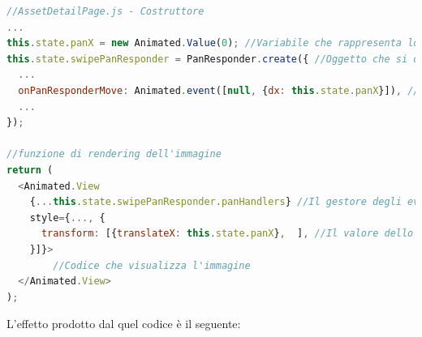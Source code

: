 \begin{lstlisting}[language=JavaScript, caption=AssetDetailPage - Spostamento dell'immagine allo swipe delll'utente]
//AssetDetailPage.js - Costruttore
...
this.state.panX = new Animated.Value(0); //Variabile che rappresenta lo spostamento dell'immagine
this.state.swipePanResponder = PanResponder.create({ //Oggetto che si occupa di rilevare le gesture dell'utente
  ...
  onPanResponderMove: Animated.event([null, {dx: this.state.panX}]), //All'evento onPanResponderMove, che viene sollevato quando l'utente esegue un pan (equivalente del drag'n'drop nei dispositivi touchscreen) viene collegata la variabile panX, in modo che il valore della variabile venga modificato e che la modifica venga effettuata in modo animato
  ...
});

//funzione di rendering dell'immagine
return (
  <Animated.View
    {...this.state.swipePanResponder.panHandlers} //Il gestore degli eventi viene collegato alla View
    style={..., {
      transform: [{translateX: this.state.panX},  ], //Il valore dello spostamento viene associato allo stile della View, in particolare alla traslazione sull'asse X
    }]}>
    	//Codice che visualizza l'immagine
  </Animated.View>
);
\end{lstlisting}

L'effetto prodotto dal quel codice è il seguente:

